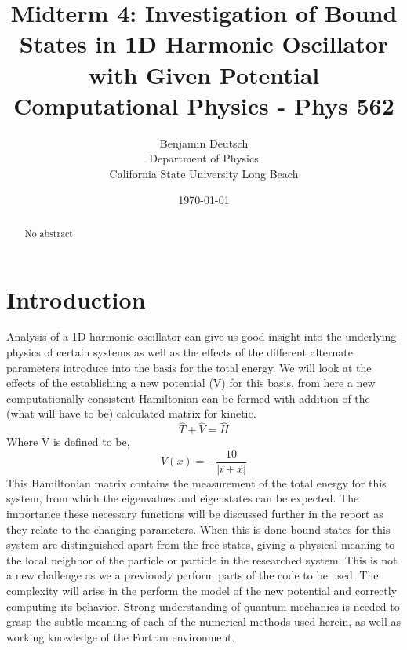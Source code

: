 \documentclass[12pt,letterpaper,notitlepage]{article}
\begin{document}




\title{%
	Midterm 4: Investigation of Bound States in 1D Harmonic Oscillator with Given Potential   \\
\large Computational Physics - Phys 562}
\author{Benjamin Deutsch  \\
Department of Physics\\
California State University Long Beach}
\date{\today }
\maketitle



\begin{abstract}
No abstract    
\end{abstract}

\section{Introduction}

Analysis of a 1D harmonic oscillator can give us good insight into the underlying physics of certain systems as well as the effects of the different alternate parameters introduce into the basis for the total energy. We will look at the effects of the establishing a new potential (V) for this basis, from here a new computationally consistent Hamiltonian can be formed with addition of the (what will have to be) calculated matrix for kinetic.
\begin{equation}
\hat{T}+\hat{V}=\hat{H} 
\end{equation}
Where V is defined to be, 
\begin{equation}
V(x)=-\frac{10}{|i+x|}
\end{equation}
This Hamiltonian matrix contains the measurement of the total energy for this system, from which the eigenvalues and eigenstates can be expected. The importance these necessary functions will be discussed further in the report as they relate to the changing parameters. When this is done bound states for this system are distinguished apart from the free states, giving a physical meaning to the local neighbor of the particle or particle in the researched system. This is not a new challenge as we a previously perform parts of the code to be used. The complexity will arise in the perform the model of the new potential and correctly computing its behavior. Strong understanding of quantum mechanics is needed to grasp the subtle meaning of each of the numerical methods used herein, as well as working knowledge of the Fortran environment.
\end{document}
